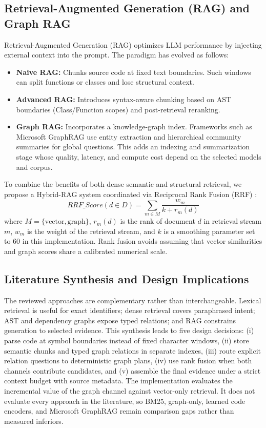 \documentclass[12pt,letterpaper,oneside]{report}
\begin{document}
\subsection{Retrieval-Augmented Generation (RAG) and Graph RAG}
Retrieval-Augmented Generation (RAG) \cite{lewis2020rag} optimizes LLM performance by injecting external context into the prompt. The paradigm has evolved as follows:
\begin{itemize}
    \item \textbf{Naive RAG:} Chunks source code at fixed text boundaries. Such windows can split functions or classes and lose structural context.
    \item \textbf{Advanced RAG:} Introduces syntax-aware chunking based on AST boundaries (Class/Function scopes) and post-retrieval reranking.
    \item \textbf{Graph RAG:} Incorporates a knowledge-graph index. Frameworks such as Microsoft GraphRAG \cite{edge2024graphrag} use entity extraction and hierarchical community summaries for global questions. This adds an indexing and summarization stage whose quality, latency, and compute cost depend on the selected models and corpus.
\end{itemize}
To combine the benefits of both dense semantic and structural retrieval, we propose a Hybrid-RAG system coordinated via Reciprocal Rank Fusion (RRF) \cite{cormack2009rrf}:
\begin{equation}
    RRF\_Score(d \in D) = \sum_{m \in M} \frac{w_m}{k + r_m(d)}
\end{equation}
where $M = \{\text{vector}, \text{graph}\}$, $r_m(d)$ is the rank of document $d$ in retrieval stream $m$, $w_m$ is the weight of the retrieval stream, and $k$ is a smoothing parameter set to 60 in this implementation. Rank fusion avoids assuming that vector similarities and graph scores share a calibrated numerical scale.

\subsection{Literature Synthesis and Design Implications}
The reviewed approaches are complementary rather than interchangeable. Lexical retrieval is useful for exact identifiers; dense retrieval covers paraphrased intent; AST and dependency graphs expose typed relations; and RAG constrains generation to selected evidence. This synthesis leads to five design decisions: (i) parse code at symbol boundaries instead of fixed character windows, (ii) store semantic chunks and typed graph relations in separate indexes, (iii) route explicit relation questions to deterministic graph plans, (iv) use rank fusion when both channels contribute candidates, and (v) assemble the final evidence under a strict context budget with source metadata. The implementation evaluates the incremental value of the graph channel against vector-only retrieval. It does not evaluate every approach in the literature, so BM25, graph-only, learned code encoders, and Microsoft GraphRAG remain comparison gaps rather than measured inferiors.
\end{document}
